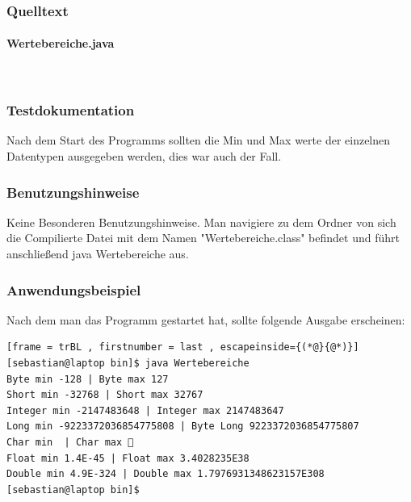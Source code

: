 \subsubsection{Quelltext}
\paragraph{Wertebereiche.java}\



\subsubsection{Testdokumentation}
Nach dem Start des Programms sollten die Min und Max werte der einzelnen Datentypen ausgegeben
werden, dies war auch der Fall.

\subsubsection{Benutzungshinweise}
Keine Besonderen Benutzungshinweise.
Man navigiere zu dem Ordner von sich die Compilierte Datei mit dem Namen "Wertebereiche.class"
\space befindet und führt anschlie\ss end java Wertebereiche aus.

\subsubsection{Anwendungsbeispiel}
Nach dem man das Programm gestartet hat, sollte folgende Ausgabe erscheinen:
\begin{lstlisting}[frame = trBL , firstnumber = last , escapeinside={(*@}{@*)}]
[sebastian@laptop bin]$ java Wertebereiche
Byte min -128 | Byte max 127
Short min -32768 | Short max 32767
Integer min -2147483648 | Integer max 2147483647
Long min -9223372036854775808 | Byte Long 9223372036854775807
Char min  | Char max ￿
Float min 1.4E-45 | Float max 3.4028235E38
Double min 4.9E-324 | Double max 1.7976931348623157E308
[sebastian@laptop bin]$ 
\end{lstlisting}